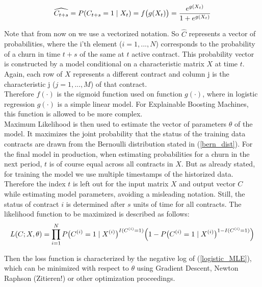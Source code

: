 \documentclass[12pt,titlepage]{article}
\begin{document}
\begin{equation} \label{bern_dist}
    \widehat{C_{t+s}} = P(C_{t+s}=1\mid X_{t}) = f\big(g(X_{t})\big) = \frac{e^{g(X_{t})}}{1 + e^{g(X_{t})}} \\
\end{equation}

Note that from now on we use a vectorized notation. So $\hat{C}$ represents a vector of probabilities, where the i'th element ($i = 1,...,N$) corresponds to the probability of a churn in time $t+s$ of the same at $t$ active contract. This probability vector is constructed by a model conditional on a characteristic matrix $X$ at time $t$. Again, each row of $X$ represents a different contract and column j is the characteristic j ($j = 1,...,M$) of that contract. \\
Therefore $f(\cdot)$ is the sigmoid function used on function $g(\cdot)$, where in logistic regression $g(\cdot)$ is a simple linear model. For Explainable Boosting Machines, this function is allowed to be more complex. \\
Maximum Likelihood is then used to estimate the vector of parameters $\theta$ of the model. It maximizes the joint probability that the status of the training data contracts are drawn from the Bernoulli distribution stated in (\ref{bern_dist}). For the final model in production, when estimating probabilities for a churn in the next period, $t$ is of course equal across all contracts in $X$. But as already stated, for training the model we use multiple timestamps of the historized data. Therefore the index $t$ is left out for the input matrix $X$ and output vector $C$ while estimating model parameters, avoiding a misleading notation. Still, the status of contract $i$ is determined after $s$ units of time for all contracts. The likelihood function to be maximized is described as follows: \\

\begin{equation} \label{logistic_MLE}
    L(C; X, \theta) = \prod_{i=1}^{N}P\big(C^{(i)}=1\mid X^{(i)}\big)^{I(C^{(i)}=1)}\Big(1 - P\big(C^{(i)}=1\mid X^{(i)}\big)^{1 - I(C^{(i)}=1)}\Big) \\
\end{equation}

Then the loss function is characterized by the negative log of (\ref{logistic_MLE}), which can be minimized with respect to $\theta$ using Gradient Descent, Newton Raphson (Zitieren!) or other optimization proceedings.
\end{document}
